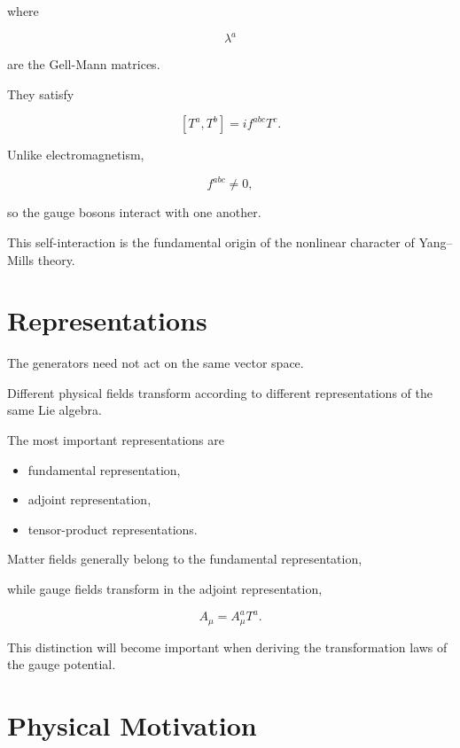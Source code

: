 where

\[
\lambda^a
\]

are the Gell-Mann matrices.

They satisfy

\[
[T^a,T^b]
=
if^{abc}T^c.
\]

Unlike electromagnetism,

\[
f^{abc}
\neq0,
\]

so the gauge bosons interact with one another.

This self-interaction is the fundamental origin of the nonlinear
character of Yang--Mills theory.


\section{Representations}

The generators need not act on the same vector space.

Different physical fields transform according to different
representations of the same Lie algebra.

The most important representations are

\begin{itemize}

\item fundamental representation,

\item adjoint representation,

\item tensor-product representations.

\end{itemize}

Matter fields generally belong to the fundamental representation,

while gauge fields transform in the adjoint representation,

\[
A_\mu
=
A_\mu^aT^a.
\]

This distinction will become important when deriving the transformation
laws of the gauge potential.


\section{Physical Motivation}

